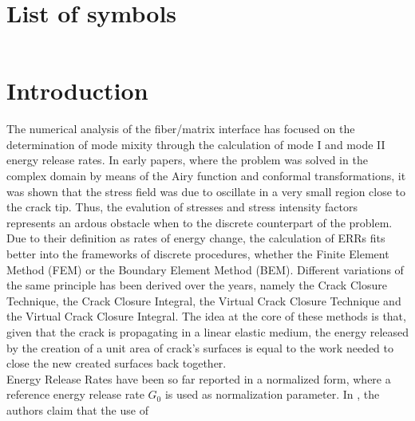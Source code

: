 \documentclass[a4paper]{jpconf}
\begin{document}

\section*{List of symbols}

\begin{tabular}{lcl}

\end{tabular}

\clearpage

\section{Introduction}

The numerical analysis of the fiber/matrix interface has focused on the determination of mode mixity through the calculation of mode I and mode II energy release rates. In early papers, where the problem was solved in the complex domain by means of the Airy function and conformal transformations, it was shown that the stress field was due to oscillate in a very small region close to the crack tip. Thus, the evalution of stresses and stress intensity factors represents an ardous obstacle when to the discrete counterpart of the problem. \\
Due to their definition as rates of energy change, the calculation of ERRs fits better into the frameworks of discrete procedures, whether the Finite Element Method (FEM) or the Boundary Element Method (BEM). Different variations of the same principle has been derived over the years, namely the Crack Closure Technique, the Crack Closure Integral, the Virtual Crack Closure Technique and the Virtual Crack Closure Integral. The idea at the core of these methods is that, given that the crack is propagating in a linear elastic medium, the energy released by the creation of a unit area of crack's surfaces is equal to the work needed to close the new created surfaces back together.\\
Energy Release Rates have been so far reported in a normalized form, where a reference energy release rate $G_{0}$ is used as normalization parameter. In \cite{sevilla one fiber}, the authors claim that the use of
\end{document}
